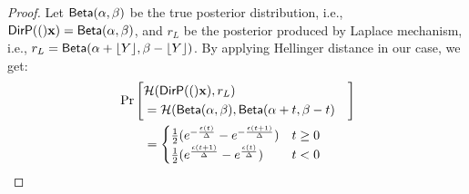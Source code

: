 \documentclass{article}
\begin{document}
\begin{proof}
Let $\mathsf{Beta}(\alpha, \beta)$ be the true posterior distribution, i.e., $\mathsf{DirP}(()\textbf{x}) = \mathsf{Beta}(\alpha, \beta)$, and $r_L$ be the posterior produced by Laplace mechanism, i.e., $r_L = \mathsf{Beta}(\alpha + \lfloor Y \rfloor, \beta - \lfloor Y \rfloor)$. By applying Hellinger distance in our case, we get:
\begin{align*}
&
\Pr\left[
\begin{aligned}
\lefteqn{\hellinger(\bysinfer(\dataobs), r_L )}\\ 
&= \hellinger(\betad(\alpha, \beta), \betad(\alpha + t, \beta - t)
\end{aligned}
\right]
\\
&\qquad = 
\begin{cases}
\frac{1}{2} (e^{- \frac{\epsilon (t)}{\Delta }} - e^{- \frac{\epsilon (t + 1)}{\Delta }}) &  t \geq 0\\
\frac{1}{2} (e^{\frac{\epsilon (t + 1)}{\Delta }} - e^{\frac{\epsilon (t)}{\Delta }}) & t < 0
\end{cases}
\end{align*}


\end{proof}
\end{document}

